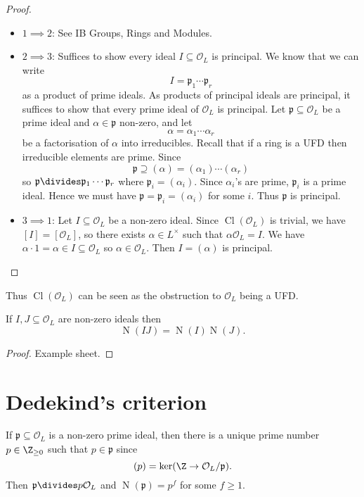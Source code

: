 \documentclass[a4paper]{article}
\renewcommand*{\O}{\mathcal{O}}
\DeclareMathOperator{\n}{N}
\DeclareMathOperator{\Cl}{Cl} %
\begin{document}
\begin{proof}\leavevmode
  \begin{itemize}
  \item \(1 \implies 2\): See IB Groups, Rings and Modules.
  \item \(2 \implies 3\): Suffices to show every ideal \(I \subseteq \O_L\) is principal. We know that we can write
    \[
      I = \mathfrak{p}_1 \cdots \mathfrak{p}_r
    \]
    as a product of prime ideals. As products of principal ideals are principal, it suffices to show that every prime ideal of \(\O_L\) is principal. Let \(\mathfrak{p} \subseteq \O_L\) be a prime ideal and \(\alpha \in \mathfrak{p}\) non-zero, and let
    \[
      \alpha = \alpha_1 \cdots \alpha_r
    \]
    be a factorisation of \(\alpha\) into irreducibles. Recall that if a ring is a UFD then irreducible elements are prime. Since
    \[
      \mathfrak{p} \supseteq (\alpha) = (\alpha_1) \cdots (\alpha_r)
    \]
    so \(\mathfrak{p} \divides \mathfrak{p}_1 \cdots \mathfrak{p}_r\) where \(\mathfrak{p}_i = (\alpha_i)\). Since \(\alpha_i\)'s are prime, \(\mathfrak{p}_i\) is a prime ideal. Hence we must have \(\mathfrak{p} = \mathfrak{p}_i = (\alpha_i)\) for some \(i\). Thus \(\mathfrak{p}\) is principal.
  \item \(3 \implies 1\): Let \(I \subseteq \O_L\) be a non-zero ideal. Since \(\Cl(\O_L)\) is trivial, we have \([I] = [\O_L]\), so there exists \(\alpha \in L^\times\) such that \(\alpha \O_L = I\). We have \(\alpha \cdot 1 = \alpha \in I \subseteq \O_L\) so \(\alpha \in \O_L\). Then \(I = (\alpha)\) is principal.
  \end{itemize}
\end{proof}

Thus \(\Cl(\O_L)\) can be seen as the obstruction to \(\O_L\) being a UFD.

\begin{lemma}
  If \(I, J \subseteq \O_L\) are non-zero ideals then
  \[
    \n(IJ) = \n(I)\n(J).
  \]
\end{lemma}

\begin{proof}
  Example sheet.
\end{proof}

\section{Dedekind's criterion}

If \(\mathfrak{p} \subseteq \O_L\) is a non-zero prime ideal, then there is a unique prime number \(p \in \Z_{\geq 0}\) such that \(p \in \mathfrak{p}\) since
\[
  (p) = \ker (\Z \to \O_L/\mathfrak{p}).
\]
Then \(\mathfrak p \divides p \O_L\) and \(\n(\mathfrak p) = p^f\) for some \(f \geq 1\).
\end{document}

